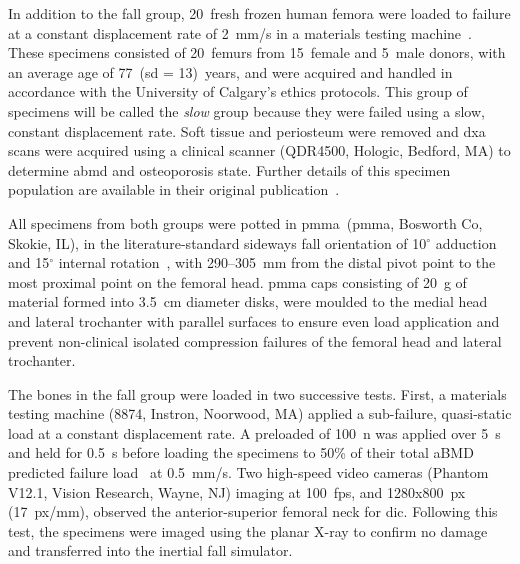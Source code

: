 In addition to the fall group, 20~fresh frozen human femora were loaded to failure at a constant displacement rate of 2~\ac{mm}/\ac{s} in a materials testing machine~\cite{nishiyama_proximal_2013}.
These specimens consisted of 20~femurs from 15~female and 5~male donors, with an average age of 77~(\ac{sd} = 13)~years, and were acquired and handled in accordance with the University of Calgary's ethics protocols.
This group of specimens will be called the \textit{slow} group because they were failed using a slow, constant displacement rate.
Soft tissue and periosteum were removed and \ac{dxa} scans were acquired using a clinical scanner (QDR4500, Hologic, Bedford, MA) to determine \ac{abmd} and osteoporosis state.
Further details of this specimen population are available in their original publication~\cite{nishiyama_proximal_2013}.

All specimens from both groups were potted in \acl{pmma}~(\acs{pmma}, Bosworth Co, Skokie, IL), in the literature-standard sideways fall orientation of 10$^\circ$ adduction and 15$^\circ$ internal rotation~\cite{courtney_effects_1994,pinilla_impact_1996,lochmuller_mechanical_2002,de_bakker_during_2009,manske_cortical_2008,manske_femoral_2006}, with 290--305~\ac{mm} from the distal pivot point to the most proximal point on the femoral head.
\ac{pmma} caps consisting of 20~\ac{g} of material formed into 3.5~\ac{cm} diameter disks, were moulded to the medial head and lateral trochanter with parallel surfaces to ensure even load application and prevent non-clinical isolated compression failures of the femoral head and lateral trochanter.

The bones in the fall group were loaded in two successive tests.
First, a materials testing machine (8874, Instron, Noorwood, MA) applied a sub-failure, quasi-static load at a constant displacement rate.
A preloaded of 100~\ac{n} was applied over 5~\ac{s} and held for 0.5~\ac{s} before loading the specimens to 50\% of their total aBMD predicted failure load~\cite{boehm_prediction_2008} at 0.5~\ac{mm}/\ac{s}.
Two high-speed video cameras (Phantom V12.1, Vision Research, Wayne, NJ) imaging at 100~\acf{fps}, and 1280x800~\ac{px} (17~\ac{px}/\ac{mm}), observed the anterior-superior femoral neck for \ac{dic}.
Following this test, the specimens were imaged using the planar X-ray to confirm no damage and transferred into the inertial fall simulator.

